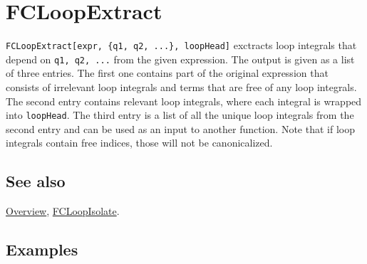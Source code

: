 \documentclass[../FeynCalcManual.tex]{subfiles}
\begin{document}
\hypertarget{fcloopextract}{%
\section{FCLoopExtract}\label{fcloopextract}}

\texttt{FCLoopExtract[\allowbreak{}expr,\ \allowbreak{}\{\allowbreak{}q1,\ \allowbreak{}q2,\ \allowbreak{}...\},\ \allowbreak{}loopHead]}
exctracts loop integrals that depend on
\texttt{q1,\ \allowbreak{}q2,\ \allowbreak{}...} from the given
expression. The output is given as a list of three entries. The first
one contains part of the original expression that consists of irrelevant
loop integrals and terms that are free of any loop integrals. The second
entry contains relevant loop integrals, where each integral is wrapped
into \texttt{loopHead}. The third entry is a list of all the unique loop
integrals from the second entry and can be used as an input to another
function. Note that if loop integrals contain free indices, those will
not be canonicalized.

\subsection{See also}

\hyperlink{toc}{Overview}, \hyperlink{fcloopisolate}{FCLoopIsolate}.

\subsection{Examples}

\begin{Shaded}
\begin{Highlighting}[]
\OperatorTok{[}\OperatorTok{[} \SpecialCharTok{{-}}\OperatorTok{]}\OperatorTok{[} \SpecialCharTok{{-}}\OperatorTok{]} \SpecialCharTok{+} \OperatorTok{[}\OperatorTok{]}\OperatorTok{[}\OperatorTok{,}\OperatorTok{]}\OperatorTok{[}\OperatorTok{,}  \SpecialCharTok{{-}}\OperatorTok{,} \OperatorTok{\{} \SpecialCharTok{{-}}\OperatorTok{,} \OperatorTok{\}]]} 
 
\OperatorTok{[}\SpecialCharTok{\%}\OperatorTok{,} \OperatorTok{\{}\OperatorTok{\},}\OperatorTok{]}
\end{Highlighting}
\end{Shaded}
\end{document}
